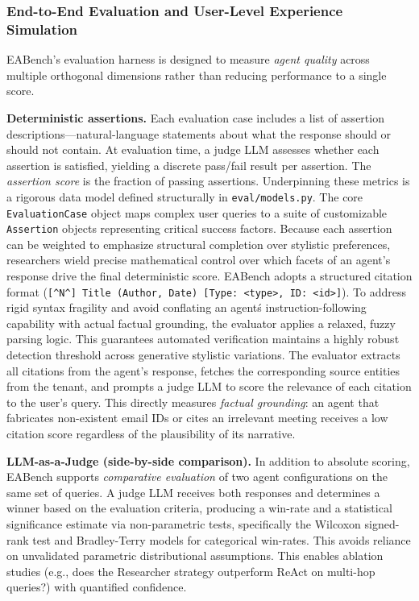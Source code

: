 \documentclass[journal,dvipsnames]{acmart}
\begin{document}
\subsubsection{End-to-End Evaluation and User-Level Experience Simulation}
\label{sec:eval}

EABench's evaluation harness is designed to measure \emph{agent quality} across
multiple orthogonal dimensions rather than reducing performance to a single
score.

\textbf{Deterministic assertions.}
Each evaluation case includes a list of assertion descriptions---natural-language
  statements about what the response should or should not contain. At evaluation
  time, a judge LLM assesses whether each assertion is satisfied, yielding a
  discrete pass/fail result per assertion. The \emph{assertion score} is the
  fraction of passing assertions. Underpinning these metrics is a rigorous data model defined structurally in \texttt{eval/models.py}. The core \texttt{EvaluationCase} object maps complex user queries to a suite of customizable \texttt{Assertion} objects representing critical success factors. Because each assertion can be weighted to emphasize structural completion over stylistic preferences, researchers wield precise mathematical control over which facets of an agent's response drive the final deterministic score.
EABench adopts a structured citation format (\texttt{[\^{}N\^{}] Title (Author, Date) [Type: <type>, ID: <id>]}). To address rigid syntax fragility and avoid conflating an agent\'s instruction-following capability with actual factual grounding, the evaluator applies a relaxed, fuzzy parsing logic. This guarantees automated verification maintains a highly robust detection threshold across generative stylistic variations.  The evaluator extracts all citations from the
agent's response, fetches the corresponding source entities from the tenant,
and prompts a judge LLM to score the relevance of each citation to the user's
query.  This directly measures \emph{factual grounding}: an agent that
fabricates non-existent email IDs or cites an irrelevant meeting receives a low
citation score regardless of the plausibility of its narrative.

\textbf{LLM-as-a-Judge (side-by-side comparison).}
In addition to absolute scoring, EABench supports \emph{comparative evaluation}
of two agent configurations on the same set of queries.  A judge LLM receives
both responses and determines a winner based on the evaluation criteria,
producing a win-rate and a statistical significance estimate via non-parametric tests, specifically the Wilcoxon signed-rank test and Bradley-Terry models for categorical win-rates. This avoids reliance on unvalidated parametric distributional assumptions.  This enables ablation studies (e.g., does the Researcher strategy
outperform ReAct on multi-hop queries?) with quantified confidence.
\end{document}

